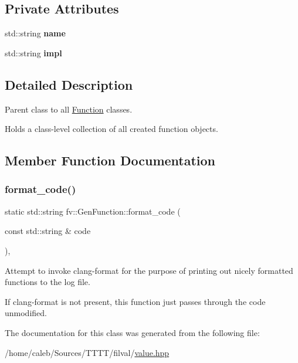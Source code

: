 \subsection*{Private Attributes}
\begin{DoxyCompactItemize}
\item 
\hypertarget{classfv_1_1GenFunction_a1ebce4419daac987081baf73bb8de795}{}\label{classfv_1_1GenFunction_a1ebce4419daac987081baf73bb8de795} 
std\+::string {\bfseries name}
\item 
\hypertarget{classfv_1_1GenFunction_adafc97b5aa9684e027988bbfb5a8514b}{}\label{classfv_1_1GenFunction_adafc97b5aa9684e027988bbfb5a8514b} 
std\+::string {\bfseries impl}
\end{DoxyCompactItemize}


\subsection{Detailed Description}
Parent class to all \hyperlink{classfv_1_1Function}{Function} classes. 

Holds a class-\/level collection of all created function objects. 

\subsection{Member Function Documentation}
\hypertarget{classfv_1_1GenFunction_aecc1187b5bb9c551c104eb8478bdb567}{}\label{classfv_1_1GenFunction_aecc1187b5bb9c551c104eb8478bdb567} 
\subsubsection{\texorpdfstring{format\+\_\+code()}{format\_code()}}
{\footnotesize\ttfamily static std\+::string fv\+::\+Gen\+Function\+::format\+\_\+code (\begin{DoxyParamCaption}\item[{const std\+::string \&}]{code }\end{DoxyParamCaption})\hspace{0.3cm}{\ttfamily [inline]}, {\ttfamily [static]}}



Attempt to invoke clang-\/format for the purpose of printing out nicely formatted functions to the log file. 

If clang-\/format is not present, this function just passes through the code unmodified. 

The documentation for this class was generated from the following file\+:\begin{DoxyCompactItemize}
\item 
/home/caleb/\+Sources/\+T\+T\+T\+T/filval/\hyperlink{value_8hpp}{value.\+hpp}\end{DoxyCompactItemize}
